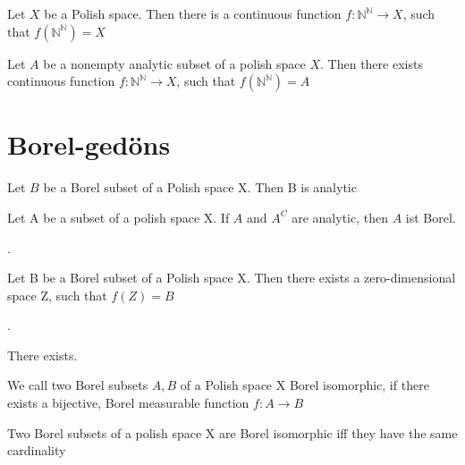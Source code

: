 \documentclass[10pt, a4paper, titlepage]{article}
\numberwithin{equation}{section}
\begin{document}
\begin{theorem}
	Let $X$ be a Polish space. Then there is a continuous function $f: \mathbb{N}^\mathbb{N} \to X $, such that $f\left( \mathbb{N}^\mathbb{N} \right) = X$
\end{theorem}


\begin{theorem}
	Let $A$ be a nonempty analytic subset of a polish space $X$. Then there exists continuous function $f: \mathbb{N}^{\mathbb{N}} \to X$, such that $f\left( \mathbb{N}^{\mathbb{N}} \right) = A$
\end{theorem}

\section{Borel-gedöns}

\begin{theorem}
	Let $B$ be a Borel subset of a Polish space X. Then B is analytic		
\end{theorem}

\begin{theorem}
	Let A be a subset of a polish space X. If $A$ and  $A^{C}$ are analytic, then $A$ ist Borel.  
\end{theorem}


\begin{definition}
	.	
\end{definition}

\begin{theorem}
	Let B be a Borel subset of a Polish space X. Then there exists a zero-dimensional space Z, such that $f(Z) = B$
\end{theorem}

\begin{theorem}
	.
\end{theorem}

\begin{theorem}
	There exists.
\end{theorem}

\begin{definition}
	We call two Borel subsets $A,B$ of a Polish space X Borel isomorphic, if there exists a bijective, Borel measurable function $f: A \to B$
\end{definition}


\begin{theorem}
	Two Borel subsets of a polish space X are Borel isomorphic iff they have the same cardinality
\end{theorem}
\end{document}

